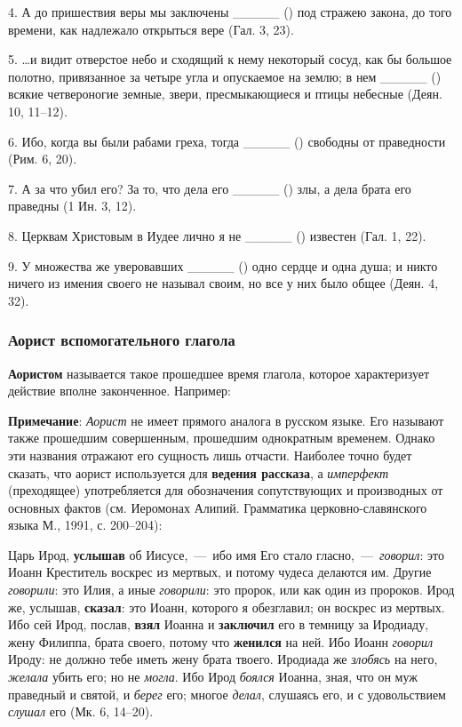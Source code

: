 \documentclass[11pt,a4paper,oneside]{memoir}
\newcommand{\hspca}{\hspace{2.4em}}
\begin{document}
    4. А до пришествия веры мы заключены _____ ({}) под стражею закона, до того времени, как надлежало открыться вере (Гал. 3, 23).
    
    5. \ldots и видит отверстое небо и сходящий к нему некоторый сосуд, как бы большое полотно, привязанное за четыре угла и опускаемое на землю; в нем _____ ({}) всякие четвероногие земные, звери, пресмыкающиеся и птицы небесные (Деян. 10, 11--12).
    
    6. Ибо, когда вы были рабами греха, тогда _____ ({}) свободны от праведности (Рим. 6, 20).
    
    7. А за что убил его? За то, что дела его _____ ({}) злы, а дела брата его праведны (1 Ин. 3, 12).
    
    8. Церквам Христовым в Иудее лично я не _____ ({}) известен (Гал. 1, 22).
    
    9. У множества же уверовавших _____ ({}) одно сердце и одна душа; и никто ничего из имения своего не называл своим, но все у них было общее (Деян. 4, 32).

                \subsubsection{Аорист вспомогательного глагола {}}

    \textbf{Аористом} называется такое прошедшее время глагола, которое характеризует действие вполне законченное. Например:
    
    
    \bigskip\autorows{l}{1}{l}{
        \hspca{{\slv{То́й речѐ и҆}} {\slv{\large бы́ша}} (Пс. 32, 9)}
    }

    \textbf{Примечание}: \emph{Аорист} не имеет прямого аналога в русском языке. Его называют также прошедшим совершенным, прошедшим однократным временем. Однако эти названия отражают его сущность лишь отчасти. Наиболее точно будет сказать, что аорист используется для \textbf{ведения рассказа}, а \emph{имперфект} (преходящее) употребляется для обозначения сопутствующих и производных от основных фактов (см. Иеромонах Алипий. Грамматика церковно-славянского языка М., 1991, с. 200--204):
    
    Царь Ирод, \textbf{услышав} об Иисусе,~---~ибо имя Его стало гласно,~---~\emph{говорил}: это Иоанн Креститель воскрес из мертвых, и потому чудеса делаются им. Другие \emph{говорили}: это Илия, а иные \emph{говорили}: это пророк, или как один из пророков. Ирод же, услышав, \textbf{сказал}: это Иоанн, которого я обезглавил; он воскрес из мертвых. Ибо сей Ирод, послав, \textbf{взял} Иоанна и \textbf{заключил} его в темницу за Иродиаду, жену Филиппа, брата своего, потому что \textbf{женился} на ней. Ибо Иоанн \emph{говорил} Ироду: не должно тебе иметь жену брата твоего. Иродиада же \emph{злобясь} на него, \emph{желала} убить его; но не \emph{могла}. Ибо Ирод \emph{боялся} Иоанна, зная, что он муж праведный и святой, и \emph{берег} его; многое \emph{делал}, слушаясь его, и с удовольствием \emph{слушал} его (Мк. 6, 14--20).
    
\end{document}
